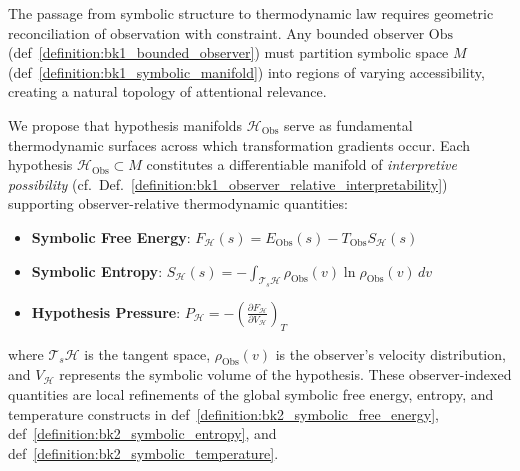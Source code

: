 \begin{scholium} 
\label{scholium:bk2_on_hypotheses_as_thermodyn}
The passage from symbolic structure to thermodynamic law requires geometric reconciliation of observation with constraint. Any bounded observer $\text{Obs}$ (def~\ref{definition:bk1_bounded_observer}) must partition symbolic space $M$ (def~\ref{definition:bk1_symbolic_manifold}) into regions of varying accessibility, creating a natural topology of attentional relevance.

We propose that hypothesis manifolds $\mathcal{H}_{\text{Obs}}$ serve as fundamental thermodynamic surfaces across which transformation gradients occur. Each hypothesis $\mathcal{H}_{\text{Obs}} \subset M$ constitutes a differentiable manifold of \emph{interpretive possibility} (cf.~Def.~\ref{definition:bk1_observer_relative_interpretability}) supporting observer-relative thermodynamic quantities:

\begin{itemize}
    \item \textbf{Symbolic Free Energy}: $F_{\mathcal{H}}(s) = E_{\text{Obs}}(s) - T_{\text{Obs}} S_{\mathcal{H}}(s)$
    \item \textbf{Symbolic Entropy}: $S_{\mathcal{H}}(s) = -\int_{\mathcal{T}_s\mathcal{H}} \rho_{\text{Obs}}(v) \ln \rho_{\text{Obs}}(v) \, dv$
    \item \textbf{Hypothesis Pressure}: $P_{\mathcal{H}} = -\left(\frac{\partial F_{\mathcal{H}}}{\partial V_{\mathcal{H}}}\right)_{T}$
\end{itemize}

where $\mathcal{T}_s\mathcal{H}$ is the tangent space, $\rho_{\text{Obs}}(v)$ is the observer's velocity distribution, and $V_{\mathcal{H}}$ represents the symbolic volume of the hypothesis.
These observer-indexed quantities are local refinements of the global symbolic free energy, entropy, and temperature constructs in def~\ref{definition:bk2_symbolic_free_energy}, def~\ref{definition:bk2_symbolic_entropy}, and def~\ref{definition:bk2_symbolic_temperature}.
\end{scholium}

